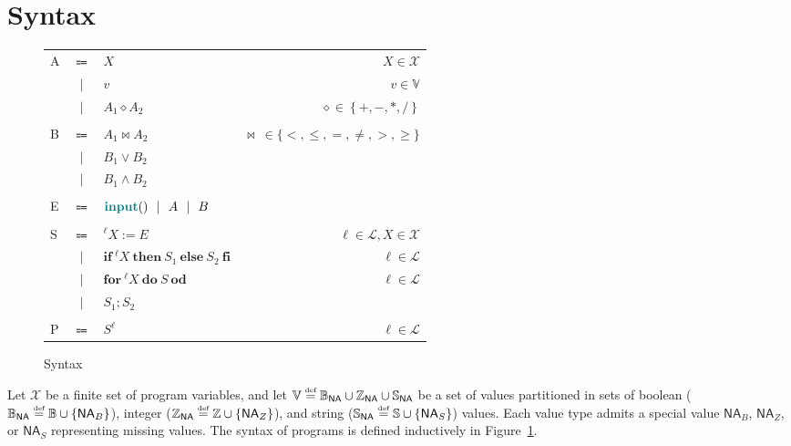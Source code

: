 \documentclass{article}
\newcommand{\defined}{\ensuremath{\stackrel{\mbox{\tiny def}}{=}}\xspace} %
\newcommand{\vars}{\ensuremath{\mathcal{X}}\xspace} %
\newcommand{\vals}{\ensuremath{\mathbb{V}}\xspace} %
\newcommand{\bvals}{\ensuremath{\mathbb{B}_\mathsf{NA}}\xspace} %
\newcommand{\bools}{\ensuremath{\mathbb{B}}\xspace} %
\newcommand{\bna}{\ensuremath{\mathsf{NA}_{B}}\xspace} %
\newcommand{\ivals}{\ensuremath{\mathbb{Z}_\mathsf{NA}}\xspace} %
\newcommand{\ints}{\ensuremath{\mathbb{Z}}\xspace} %
\newcommand{\ina}{\ensuremath{\mathsf{NA}_{Z}}\xspace} %
\newcommand{\svals}{\ensuremath{\mathbb{S}_\mathsf{NA}}\xspace} %
\newcommand{\strings}{\ensuremath{\mathbb{S}}\xspace} %
\newcommand{\sna}{\ensuremath{\mathsf{NA}_{S}}\xspace} %
\newcommand{\ipt}{\ensuremath{\mathsf{\mathbf{\color{teal}input}}()}\xspace} %
\newcommand{\set}[1]{\ensuremath{\left\{#1\right\}}\xspace} %
\newcommand{\labels}{\ensuremath{\mathcal{L}}\xspace} %
\begin{document}
\section*{Syntax}

\begin{figure}[t]
	\begin{center}
		\begin{tabular}{lclr}
			A &$\Coloneqq$& $X$ & $X\in 
			\vars$ 
			\\
			&$\vert$& $v$ & $v \in \vals$ \\
			&$\vert$& $A_1 \diamond A_2 $ &
			\hspace{3em}$\diamond \in 
			\set{+,-,*,/}$ 
			\\
			\\
			B & $\Coloneqq$& $A_1 \bowtie A_2$ 
			&
			$\bowtie~\in
			\{<, \leq, =, \not=, >, \geq\}$ \\
			&$\vert$ & $%
			B_1 \lor 
			B_2$ & \\
			&$\vert$& $B_1 
			\land B_2$ \\
			\\
			E &$\Coloneqq$& $\ipt~~\vert~~A~~\vert~~B$%
			& \\
			\\
			S & $\Coloneqq$& $^\ell{}X := E$ & $\ell{} \in 
			\labels, X \in 
			\vars$ \\
			&$\vert$& 
			$\mathsf{\mathbf{if}}~^\ell{}X~\mathsf{\mathbf{then}}~S_1~\mathsf{\mathbf{else}}~S_2~\mathsf{\mathbf{fi}}$
			 & $\ell{} \in 
			 \labels$ \\
			 &$\vert$& 
			 $\mathsf{\mathbf{for}}~^\ell{}X~\mathsf{\mathbf{do}}~S~\mathsf{\mathbf{od}}$%
			 & $\ell{} \in \labels$ 
			 \\
			 &$\vert$&  $S_1 ; S_2$ & \\
			 \\
			 P & $\Coloneqq$& $S^\ell{}$ & $\ell{} \in 
			 \labels$
		\end{tabular}
	\end{center}
	\vspace{-1em}
	\caption{Syntax}\label{fig:syntax}
\end{figure}

Let \vars be a finite set of program variables, and let $\vals\defined\bvals \cup \ivals \cup \svals$ be a set of values partitioned  in sets of boolean ($\bvals \defined \bools \cup \{\bna\} $), integer ($\ivals \defined \ints \cup \{\ina\} $), and string ($\svals \defined \strings \cup \{\sna\} $) values. Each value type admits a special value $\bna$, $\ina$, or $\sna$ representing missing values.
The syntax of programs is defined inductively in Figure~\ref{fig:syntax}.
\end{document}
